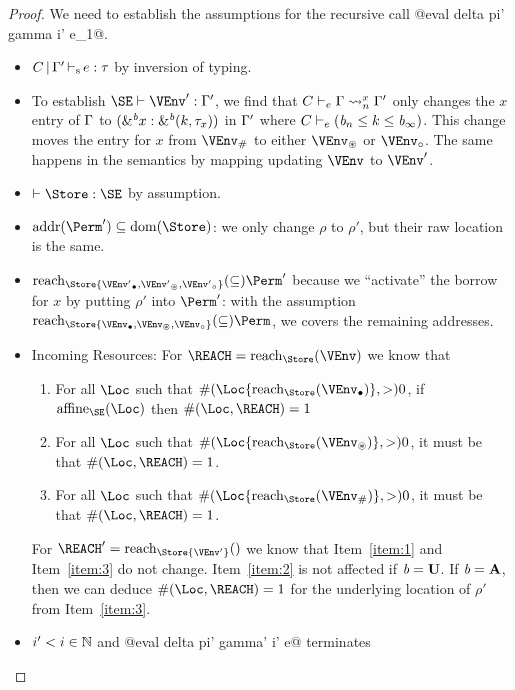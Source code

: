 \begin{proof}
  We need to establish the assumptions for the recursive call
  @eval delta pi' gamma i' e_1@.
  \begin{itemize}
  \item $\inferS{C}{\E'}{e}{\tau}$ by inversion of typing.
  \item To establish $\SE \vdash \VEnv' : \E'$, we find that
    $\lregion{C}{x}{\E}{\E'}$ only changes the $x$ entry of $\E$ to
    ${\bvar{\borrow[\BORROW]{x}}{\borrowty[\BORROW] k{\tau_x}}}$ in
    $\E'$ where $C \vdash_e {(\BORROW_n\lk k\lk\BORROW_\infty)}$. This
    change moves the entry for $x$ from $\Suspended\VEnv$ to either
    $\MutableBorrows\VEnv$ or $\ImmutableBorrows\VEnv$. The same
    happens in the semantics by mapping updating $\VEnv$ to $\VEnv'$.
  \item $\vdash \Store : \SE$ by assumption.
  \item $\Addresses{\Perm'} \subseteq \Dom\Store$: we only change
    $\rho$ to $\rho'$, but their raw location is the same.
  \item $\Reach\Store{\Active{\VEnv'}, \MutableBorrows{\VEnv'},
      \ImmutableBorrows{\VEnv'}} \subseteq \Perm'$ because we
    ``activate'' the borrow for $x$ by putting $\rho'$ into $\Perm'$:
    with the assumption $\Reach\Store{\Active\VEnv, \MutableBorrows\VEnv,
      \ImmutableBorrows\VEnv} \subseteq \Perm$, we covers the remaining addresses.
  \item Incoming Resources: For $\REACH = \Reach\Store\VEnv$ we know that
    \begin{enumerate}
    \item\label{item:1}
      For all $\Loc$ such that $\MultiNumber\Loc{\Reach{\Store}{\Active\VEnv}} >0$,
      if $\Affine{\SE}\Loc$ then $\MultiNumber\Loc\REACH= 1$
    \item\label{item:2} For all $\Loc$ such that $
      \MultiNumber\Loc{\Reach{\Store}{\MutableBorrows\VEnv}} >0$, it
      must be that $\MultiNumber\Loc\REACH=1$.
    \item\label{item:3} For all $\Loc$ such that $
      \MultiNumber\Loc{\Reach{\Store}{\Suspended\VEnv}} >0$, it
      must be that $\MultiNumber\Loc\REACH=1$.
    \end{enumerate}
    For $\REACH' = \Reach\Store{\VEnv'}$ we know that
    Item~\ref{item:1} and Item~\ref{item:3} do not change. Item~\ref{item:2} is not
    affected if $\BORROW=\IBORROW$. If $\BORROW=\MBORROW$, then we
    can deduce $\MultiNumber\Loc\REACH=1$ for the
    underlying location of $\rho'$ from Item~\ref{item:3}.
  \item  $i'<i\in\Nat$ and @eval delta pi' gamma' i' e@ terminates

\end{itemize}
\end{proof}

